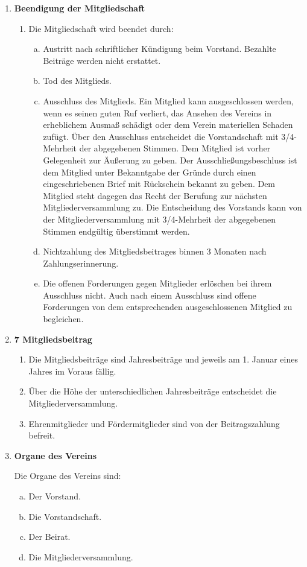 \documentclass{article}
\begin{document}
\begin{enumerate}[§ 1.]
\item \textsf{\textbf{Beendigung der Mitgliedschaft}}
	\begin{enumerate}[1.]
	\item Die Mitgliedschaft wird beendet durch:
		\begin{enumerate}[a.]
		\item Austritt nach schriftlicher Kündigung beim Vorstand. Bezahlte
Beiträge werden nicht erstattet.
		\item Tod des Mitglieds.
		\item Ausschluss des Mitglieds. Ein Mitglied kann ausgeschlossen werden, wenn es seinen guten Ruf verliert, das Ansehen des Vereins in erheblichem Ausmaß schädigt oder dem Verein materiellen
Schaden zufügt.
Über den Ausschluss entscheidet die Vorstandschaft mit 3/4-Mehrheit der abgegebenen Stimmen.
Dem Mitglied ist vorher Gelegenheit zur Äußerung zu geben.
Der Ausschließungsbeschluss ist dem Mitglied unter Bekanntgabe der Gründe durch einen eingeschriebenen Brief mit Rückschein bekannt zu geben.
Dem Mitglied steht dagegen das Recht der Berufung zur nächsten Mitgliederversammlung zu.
Die Entscheidung des Vorstands kann von der Mitgliederversammlung mit 3/4-Mehrheit der abgegebenen Stimmen endgültig überstimmt werden.
		\item Nichtzahlung des Mitgliedsbeitrages binnen 3 Monaten nach
Zahlungserinnerung.
		\item Die offenen Forderungen gegen Mitglieder erlöschen bei ihrem Ausschluss nicht.
		Auch nach einem Ausschluss sind offene Forderungen von dem entsprechenden ausgeschlossenen Mitglied zu begleichen.
		\end{enumerate}
	\end{enumerate}

\item \textsf{\textbf{7 Mitgliedsbeitrag}}
	\begin{enumerate}[1.]
	\item Die Mitgliedsbeiträge sind Jahresbeiträge und jeweils am 1. Januar eines Jahres
im Voraus fällig.
	\item Über die Höhe der unterschiedlichen Jahresbeiträge entscheidet die
Mitgliederversammlung.
	\item Ehrenmitglieder und Fördermitglieder sind von der Beitragszahlung befreit.
	\end{enumerate}
	
\item \textsf{\textbf{Organe des Vereins}}

Die Organe des Vereins sind:
	\begin{enumerate}[a.]
	\item Der Vorstand.
	\item Die Vorstandschaft.
	\item Der Beirat.
	\item Die Mitgliederversammlung.
	\end{enumerate}


\end{enumerate}
\end{document}
